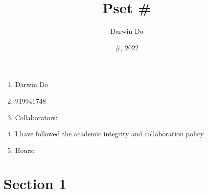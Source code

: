 \documentclass{article}
\title{Pset \#}
\begin{document}
\newcommand{\Not}{\textbf{not}}

\date{\#, 2022 }
\author{Darwin Do}

\maketitle

\begin{enumerate}
    \item Darwin Do
    \item 919941748
    \item Collaborators: 
    \item I have followed the academic integrity and collaboration policy
    \item Hours: 
\end{enumerate}

\newpage

\section{Section 1}
\end{document}
